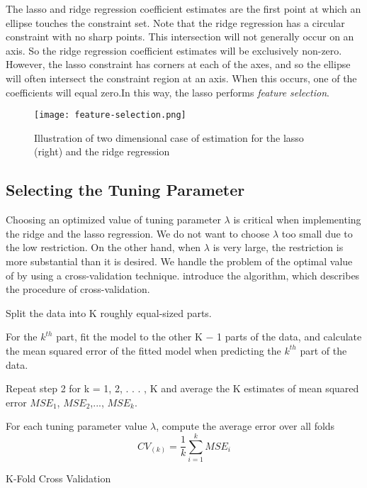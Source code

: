 The lasso and ridge regression coefficient estimates are the first point at
which an ellipse touches the constraint set.
Note that the ridge regression has a circular constraint with no sharp points.
This intersection will not generally occur on an axis. So the ridge regression
coefficient estimates will be exclusively non-zero. However, the lasso
constraint has corners at each of the axes, and so the ellipse will often
intersect the constraint region at an axis. When this occurs, one of the
coefficients will equal zero.In this way, the lasso performs \textit{feature
selection}.
\begin{figure}[H]\centering
    \texttt{[image: feature-selection.png]}
    \caption{Illustration of two dimensional case of estimation for the lasso
    (right) and the ridge regression}
    \label{fig:feature-selection}
\end{figure}

\subsection{Selecting the Tuning Parameter}

Choosing an optimized value of tuning parameter $\lambda$ is critical when
implementing the ridge and the lasso regression.
We do not want to choose $\lambda$ too small due to the low restriction. On the
other hand, when $\lambda$ is very large, the restriction is more substantial
than it is desired. We handle the problem of the optimal value of  by using a
cross-validation technique. \textcite{efron1994introduction} introduce the algorithm, which describes
the procedure of cross-validation.

\begin{algorithm}[H]
\SetAlgoLined
\renewcommand{\labelenumi}{(\Roman{enumi})}
Split the data into K roughly equal-sized parts.

For the $k^{th}$ part, fit the model to the other K − 1 parts of the data, and
calculate the mean squared error of the fitted model when predicting the
$k^{th}$ part of the data.

Repeat step 2 for k = 1, 2, . . . , K and average the K estimates of mean
squared error $MSE_1$, $MSE_2$,..., $MSE_k$.

For each tuning parameter value $\lambda$, compute the average error over all
folds \[CV_{(k)} = \frac{1}{k} \sum_{i=1}^{k} MSE_i\]

 \caption{K-Fold Cross Validation}
\end{algorithm}



